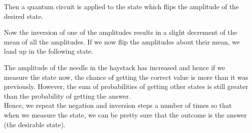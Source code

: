 \documentclass[13pt]{article}
\begin{document}

Then a quantum circuit is applied to the state which flips the amplitude of the desired state.


Now the inversion of one of the amplitudes results in a slight decrement of the mean of all the amplitudes. If we now flip the amplitudes about their mean, we land up in the following state.


The amplitude of the needle in the haystack has increased and hence if we measure the state now, the chance of getting the correct value is more than it was previously. However, the sum of probabilities of getting other states is still greater than the probability of getting the answer.\\[4pt]

Hence, we repeat the negation and inversion steps a number of times so that when we measure the state, we can be pretty sure that the outcome is the answer (the desirable state).\\[4pt]
\end{document}
